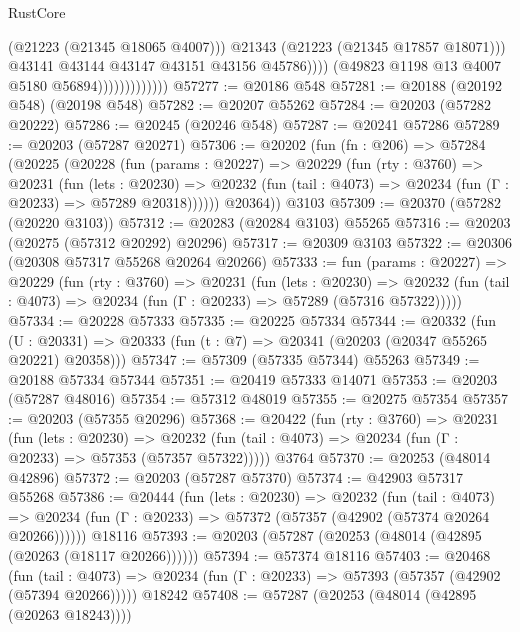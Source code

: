\begin{lexlean}{RustCore}
\begin{coremodule}
                                        (@21223 (@21345 @18065 @4007)))
                                      @21343
                                      (@21223 (@21345 @17857 @18071)))
                                    @43141
                                    @43144
                                    @43147
                                    @43151
                                    @43156
                                    @45786))))
                            (@49823 @1198 @13 @4007 @5180 @56894)))))))))))))
@57277 := @20186 @548
@57281 := @20188 (@20192 @548) (@20198 @548)
@57282 := @20207 @55262
@57284 := @20203 (@57282 @20222)
@57286 := @20245 (@20246 @548)
@57287 := @20241 @57286
@57289 := @20203 (@57287 @20271)
@57306 := @20202
    (fun (fn : @206) =>
    @57284
      (@20225
        (@20228
          (fun (params : @20227) =>
          @20229
            (fun (rty : @3760) =>
            @20231
              (fun (lets : @20230) =>
              @20232 (fun (tail : @4073) => @20234 (fun (Γ : @20233) => @57289 @20318))))))
        @20364))
    @3103
@57309 := @20370 (@57282 (@20220 @3103))
@57312 := @20283 (@20284 @3103) @55265
@57316 := @20203 (@20275 (@57312 @20292) @20296)
@57317 := @20309 @3103
@57322 := @20306 (@20308 @57317 @55268 @20264 @20266)
@57333 := fun (params : @20227) =>
  @20229
    (fun (rty : @3760) =>
    @20231
      (fun (lets : @20230) =>
      @20232 (fun (tail : @4073) => @20234 (fun (Γ : @20233) => @57289 (@57316 @57322)))))
@57334 := @20228 @57333
@57335 := @20225 @57334
@57344 := @20332
    (fun (U : @20331) => @20333 (fun (t : @7) => @20341 (@20203 (@20347 @55265 @20221) @20358)))
@57347 := @57309 (@57335 @57344) @55263
@57349 := @20188 @57334 @57344
@57351 := @20419 @57333 @14071
@57353 := @20203 (@57287 @48016)
@57354 := @57312 @48019
@57355 := @20275 @57354
@57357 := @20203 (@57355 @20296)
@57368 := @20422
    (fun (rty : @3760) =>
    @20231
      (fun (lets : @20230) =>
      @20232 (fun (tail : @4073) => @20234 (fun (Γ : @20233) => @57353 (@57357 @57322)))))
    @3764
@57370 := @20253 (@48014 @42896)
@57372 := @20203 (@57287 @57370)
@57374 := @42903 @57317 @55268
@57386 := @20444
    (fun (lets : @20230) =>
    @20232
      (fun (tail : @4073) =>
      @20234 (fun (Γ : @20233) => @57372 (@57357 (@42902 (@57374 @20264 @20266))))))
    @18116
@57393 := @20203 (@57287 (@20253 (@48014 (@42895 (@20263 (@18117 @20266))))))
@57394 := @57374 @18116
@57403 := @20468
    (fun (tail : @4073) => @20234 (fun (Γ : @20233) => @57393 (@57357 (@42902 (@57394 @20266)))))
    @18242
@57408 := @57287 (@20253 (@48014 (@42895 (@20263 @18243))))

\end{coremodule}
\end{lexlean}
